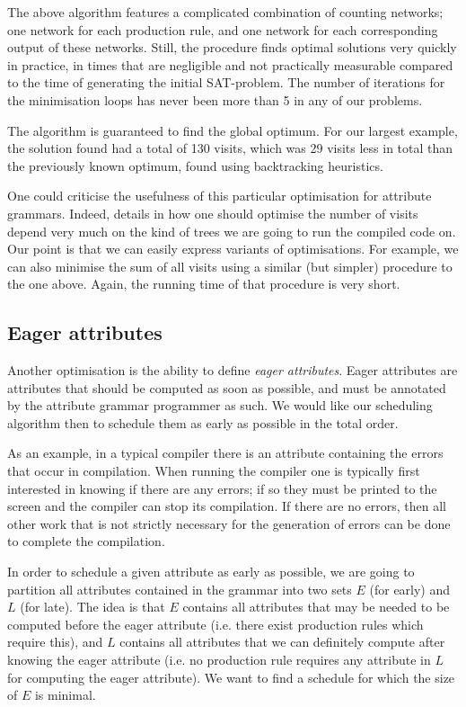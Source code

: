 \documentclass{llncs}
\begin{document}
The above algorithm features a complicated combination of counting networks; one network for each production rule, and one network for each corresponding output of these networks. Still, the procedure finds optimal solutions very quickly in practice, in times that are negligible and not practically measurable compared to the time of generating the initial SAT-problem. The number of iterations for the minimisation loops has never been more than 5 in any of our problems.

The algorithm is guaranteed to find the global optimum. For our largest example, the solution found had a total of 130 visits, which was 29 visits less in total than the previously known optimum, found using backtracking heuristics.

One could criticise the usefulness of this particular optimisation for attribute grammars. Indeed, details in how one should optimise the number of visits depend very much on the kind of trees we are going to run the compiled code on. Our point is that we can easily express variants of optimisations. For example, we can also minimise the sum of all visits using a similar (but simpler) procedure to the one above. Again, the running time of that procedure is very short.

\subsection{Eager attributes} \label{sect:eagerattributes}
Another optimisation is the ability to define \emph{eager attributes}. Eager attributes are attributes that should be computed as soon as possible, and must be annotated by the attribute grammar programmer as such. We would like our scheduling algorithm then to schedule them as early as possible in the total order.

As an example, in a typical compiler there is an attribute containing the errors that occur in compilation. When running the compiler one is typically first interested in knowing if there are any errors; if so they must be printed to the screen and the compiler can stop its compilation. If there are no errors, then all other work that is not strictly necessary for the generation of errors can be done to complete the compilation.

In order to schedule a given attribute as early as possible, we are going to partition all attributes contained in the grammar into two sets $E$ (for early) and $L$ (for late). The idea is that $E$ contains all attributes that may be needed to be computed before the eager attribute (i.e. there exist production rules which require this), and $L$ contains all attributes that we can definitely compute after knowing the eager attribute (i.e. no production rule requires any attribute in $L$ for computing the eager attribute). We want to find a schedule for which the size of $E$ is minimal.
\end{document}
